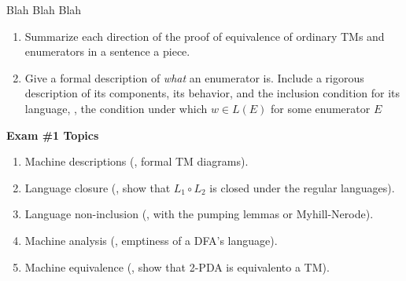 \documentclass[11pt]{book}
\begin{document}
\newpage

\begin{problem}{Blah Blah Blah}
\begin{enumerate}[label=(\alph*)]
  \item Summarize each direction of the proof of equivalence of ordinary TMs and enumerators in a sentence a piece.
  \item Give a formal description of \emph{what} an enumerator is.
    Include a rigorous description of its components, its behavior, and the inclusion condition for its language, \ie, the condition under which \( w \in L(E) \) for some enumerator \( E \)
\end{enumerate}
\end{problem}


\vspace{5in}

\noindent \textbf{Exam \#1 Topics}
\begin{enumerate}
  \item Machine descriptions (\eg, formal TM diagrams).
  \item Language closure (\eg, show that \( L_1 \circ L_2 \) is closed under the regular languages).
  \item Language non-inclusion (\eg, with the pumping lemmas or Myhill-Nerode).
  \item Machine analysis (\eg, emptiness of a DFA's language).
  \item Machine equivalence (\eg, show that 2-PDA is equivalento a TM).
\end{enumerate}
\end{document}
